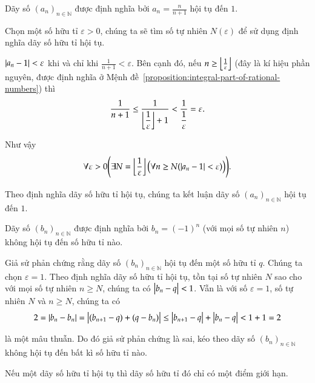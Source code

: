 \begin{example}
    Dãy số ${(a_{n})}_{n\in\mathbb{N}}$ được định nghĩa bởi $a_{n} = \frac{n}{n+1}$ hội tụ đến $1$.

    Chọn một số hữu tỉ $\varepsilon > 0$, chúng ta sẽ tìm số tự nhiên $N(\varepsilon)$ để sử dụng định nghĩa dãy số hữu tỉ hội tụ.

    $\left\vert{a_{n} - 1}\right\vert < \varepsilon$ khi và chỉ khi $\frac{1}{n+1} < \varepsilon$. Bên cạnh đó, nếu $n \geq \left\lfloor{\frac{1}{\varepsilon}}\right\rfloor$ (đây là kí hiệu phần nguyên, được định nghĩa ở Mệnh đề~\ref{proposition:integral-part-of-rational-numbers}) thì
    \[
        \frac{1}{n+1}\leq \frac{1}{\left\lfloor{\dfrac{1}{\varepsilon}}\right\rfloor + 1} < \frac{1}{\dfrac{1}{\varepsilon}} = \varepsilon.
    \]

    Như vậy
    \[
        \forall\varepsilon > 0 \Biggl( \exists N=\left\lfloor{\frac{1}{\varepsilon}}\right\rfloor\bigl(\forall n\geq N ( \left\vert{a_{n} - 1}\right\vert < \varepsilon )\bigr) \Biggr).
    \]

    Theo định nghĩa dãy số hữu tỉ hội tụ, chúng ta kết luận dãy số ${(a_{n})}_{n\in\mathbb{N}}$ hội tụ đến $1$.
\end{example}

\begin{counterexample}
    Dãy số ${(b_{n})}_{n\in\mathbb{N}}$ được định nghĩa bởi $b_{n} = {(-1)}^{n}$ (với mọi số tự nhiên $n$) không hội tụ đến số hữu tỉ nào.

    Giả sử phản chứng rằng dãy số ${(b_{n})}_{n\in\mathbb{N}}$ hội tụ đến một số hữu tỉ $q$. Chúng ta chọn $\varepsilon = 1$. Theo định nghĩa dãy số hữu tỉ hội tụ, tồn tại số tự nhiên $N$ sao cho với mọi số tự nhiên $n\geq N$, chúng ta có $\left\vert{b_{n} - q}\right\vert < 1$. Vẫn là với số $\varepsilon = 1$, số tự nhiên $N$ và $n\ge N$, chúng ta có
    \[
        2 = \left\vert{b_{n} - b_{n}}\right\vert = \left\vert{(b_{n+1} - q) + (q - b_{n})}\right\vert \leq \left\vert{b_{n+1} - q}\right\vert + \left\vert{b_{n} - q}\right\vert < 1 + 1 = 2
    \]

    là một mâu thuẫn. Do đó giả sử phản chứng là sai, kéo theo dãy số ${(b_{n})}_{n\in\mathbb{N}}$ không hội tụ đến bất kì số hữu tỉ nào.
\end{counterexample}

\begin{theorem}\label{theorem:uniqueness-of-limit-points-of-convergence-rational-sequences}
    Nếu một dãy số hữu tỉ hội tụ thì dãy số hữu tỉ đó chỉ có một điểm giới hạn.
\end{theorem}


